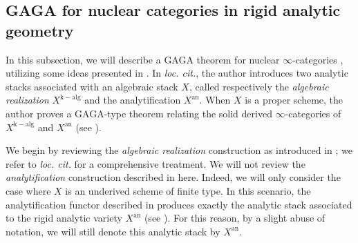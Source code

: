 \documentclass[oneside, hidelinks, 12pt, a4paper,reqno]{amsart}
\theoremstyle{plain}
\theoremstyle{definition}
\newtheorem{remark}[remark]{Remark}
\theoremstyle{plain}
\newtheorem{proposition}[proposition]{Proposition}
\newcommand{\rL}{\mathrm L}
\newcommand{\cD}{\mathscr D}
\newcommand{\cates}{$\infty$-categories }
\newcommand{\LPr}{\mathrm{Pr}^\rL}
\newcommand{\Solid}{\blacksquare}
\begin{document}

\subsection{GAGA for nuclear categories in rigid analytic geometry}

In this subsection, we will describe a GAGA theorem for nuclear \cates, utilizing some ideas presented in \cite{wang2026relativegagatheoremapplication}. 
In \emph{loc. cit.}, the author introduces two analytic stacks associated with an algebraic stack $X$, called respectively the \emph{algebraic realization} $X^{\mathrm{k-alg}}$ and the analytification $X^{\mathrm{an}}$. When $X$ is a proper scheme, the author proves a GAGA-type theorem relating the solid derived \cates of $X^{\mathrm{k-alg}}$ and $X^{\mathrm{an}}$ (see \cite[Theorem 4.1.1]{wang2026relativegagatheoremapplication}).

We begin by reviewing the \emph{algebraic realization} construction as introduced in \cite{wang2026relativegagatheoremapplication}; we refer to \emph{loc. cit.} for a comprehensive treatment. We will not review the \emph{analytification} construction described in \cite{wang2026relativegagatheoremapplication} here. Indeed, we will only consider the case where $X$ is an underived scheme of finite type. In this scenario, the analytification functor described in \cite{wang2026relativegagatheoremapplication} produces exactly the analytic stack associated to the rigid analytic variety $X^{\mathrm{an}}$ (see \cite[Lemma 3.2.9 and Lemma 3.2.12]{wang2026relativegagatheoremapplication}). For this reason, by a slight abuse of notation, we will still denote this analytic stack by $X^{\mathrm{an}}$.
\end{document}
